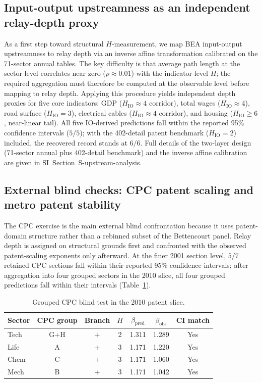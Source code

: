 \subsection{Input-output upstreamness as an independent relay-depth proxy}
\begingroup\sloppy
As a first step toward structural \(H\)-measurement, we map BEA
input-output upstreamness to relay depth via an inverse affine
transformation calibrated on the 71-sector annual tables.
The key difficulty is that average path length at the sector level
correlates near zero (\(\rho\approx 0.01\)) with the indicator-level
\(H\); the required aggregation must therefore be computed at the
observable level before mapping to relay depth.
Applying this procedure yields independent depth proxies for five
core indicators: GDP (\(H_{\mathrm{IO}}\approx 4\) corridor),
total wages (\(H_{\mathrm{IO}}\approx 4\)), road surface
(\(H_{\mathrm{IO}}=3\)), electrical cables
(\(H_{\mathrm{IO}}\approx 4\) corridor), and housing
(\(H_{\mathrm{IO}}\ge 6\), near-linear tail).
All five IO-derived predictions fall within the reported 95\% confidence
intervals (\(5/5\)); with the 402-detail patent benchmark
(\(H_{\mathrm{IO}}=2\)) included, the recovered record stands at \(6/6\).
Full details of the two-layer design (71-sector annual
plus 402-detail benchmark) and the inverse affine calibration are
given in SI~Section~\textsf{S-upstream-analysis}.
\endgroup

\subsection{External blind checks: CPC patent scaling and metro patent stability}
The CPC exercise is the main external blind confrontation because it uses
patent-domain structure rather than a rebinned subset of the Bettencourt panel.
Relay depth is assigned on structural grounds first and confronted with the
observed patent-scaling exponents only afterward. At the finer 2001 section
level, $5/7$ retained CPC sections fall within their reported 95\% confidence
intervals; after aggregation into four grouped sectors in the 2010 slice, all
four grouped predictions fall within their intervals (Table~\ref{tab:cpc_grouped}).

\begin{table}[t]
\caption{Grouped CPC blind test in the 2010 patent slice.}
\label{tab:cpc_grouped}
\centering
\begin{tabular}{lcccccc}
\toprule
Sector & CPC group & Branch & \(H\) & \(\beta_{\mathrm{pred}}\) & \(\beta_{\mathrm{obs}}\) & CI match \\
\midrule
Tech & G+H & \(+\) & 2 & 1.311 & 1.289 & Yes \\
Life & A & \(+\) & 3 & 1.171 & 1.220 & Yes \\
Chem & C & \(+\) & 3 & 1.171 & 1.060 & Yes \\
Mech & B & \(+\) & 3 & 1.171 & 1.042 & Yes \\
\bottomrule
\end{tabular}
\end{table}

